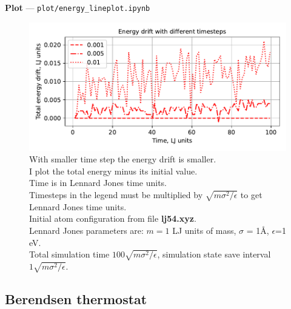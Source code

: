 \documentclass[12pt,a4paper]{article}
\begin{document}
{\bf Plot} --- \verb|plot/energy_lineplot.ipynb|

\begin{figure}[htb]
	\centering
	\includegraphics[width=.7\linewidth]{img/milestone04-total.pdf}
	\caption{With smaller time step the energy drift is smaller.\\
		I plot the total energy minus its initial value.\\
		Time is in Lennard Jones time units.\\
		Timesteps in the legend must be multiplied by $\sqrt{m\sigma^2 / \epsilon}$ to get Lennard Jones time units.\\
		Initial atom configuration from file {\bf lj54.xyz}.\\
		Lennard Jones parameters are: $m=1$ LJ units of mass, $\sigma$ = 1Å, $\epsilon$=1 eV.\\
		Total simulation time \( 100 \sqrt{m\sigma^2 / \epsilon} \), simulation state save interval \( 1 \sqrt{m\sigma^2 / \epsilon} \).}
	\label{fig:first_simulation}
\end{figure}

\clearpage


\subsection*{Berendsen thermostat}
\end{document}
